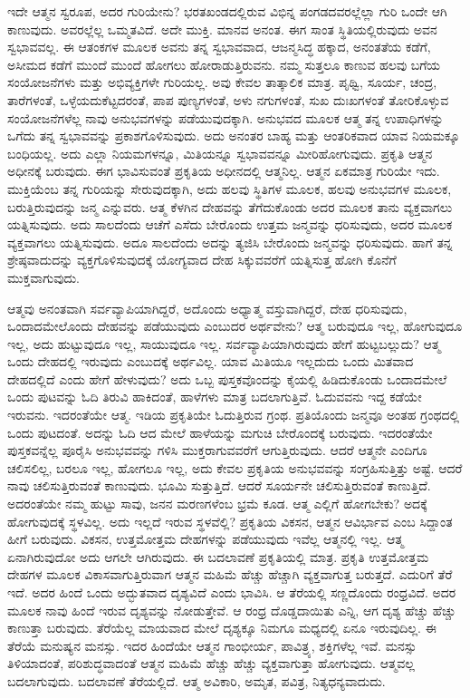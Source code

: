 ಇದೇ ಆತ್ಮನ ಸ್ವರೂಪ, ಅದರ ಗುರಿಯೇನು? ಭರತಖಂಡದಲ್ಲಿರುವ ವಿಭಿನ್ನ ಪಂಗಡದವರಲ್ಲೆಲ್ಲಾ ಗುರಿ ಒಂದೇ ಆಗಿ ಕಾಣುವುದು. ಅವರಲ್ಲೆಲ್ಲ ಒಮ್ಮತವಿದೆ. ಅದೇ ಮುಕ್ತಿ. ಮಾನವ ಅನಂತ. ಈಗ ಸಾಂತ ಸ್ಥಿತಿಯಲ್ಲಿರುವುದು ಅವನ ಸ್ವಭಾವವಲ್ಲ. ಈ ಆತಂಕಗಳ ಮೂಲಕ ಅವನು ತನ್ನ ಸ್ವಭಾವವಾದ, ಆಜನ್ಮಸಿದ್ಧ ಹಕ್ಕಾದ, ಅನಂತತೆಯ ಕಡೆಗೆ, ಅಸೀಮದ ಕಡೆಗೆ ಮುಂದೆ ಮುಂದೆ ಹೋಗಲು ಹೋರಾಡುತ್ತಿರುವನು. ನಮ್ಮ ಸುತ್ತಲೂ ಕಾಣುವ ಹಲವು ಬಗೆಯ ಸಂಯೋಜನೆಗಳು ಮತ್ತು ಅಭಿವ್ಯಕ್ತಿಗಳೇ ಗುರಿಯಲ್ಲ. ಅವು ಕೇವಲ ತಾತ್ಕಾಲಿಕ ಮಾತ್ರ. ಪೃಥ್ವಿ, ಸೂರ್ಯ, ಚಂದ್ರ, ತಾರೆಗಳಂತೆ, ಒಳ್ಳೆಯದು\break ಕೆಟ್ಟದರಂತೆ, ಪಾಪ ಪುಣ್ಯಗಳಂತೆ, ಅಳು ನಗುಗಳಂತೆ, ಸುಖ ದುಃಖಗಳಂತೆ ತೋರಿಕೊಳ್ಳುವ ಸಂಯೋಜನೆಗಳೆಲ್ಲ ನಾವು ಅನುಭವಗಳನ್ನು ಪಡೆಯುವುದಕ್ಕಾಗಿ. ಅನುಭವದ ಮೂಲಕ ಆತ್ಮ ತನ್ನ ಉಪಾಧಿಗಳನ್ನು ಒಗೆದು ತನ್ನ ಸ್ವಭಾವವನ್ನು ಪ್ರಕಾಶಗೊಳಿಸುವುದು. ಅದು ಅನಂತರ ಬಾಹ್ಯ ಮತ್ತು ಆಂತರಿಕವಾದ ಯಾವ ನಿಯಮಕ್ಕೂ ಬಂಧಿಯಲ್ಲ. ಅದು ಎಲ್ಲಾ ನಿಯಮಗಳನ್ನೂ, ಮಿತಿಯನ್ನೂ ಸ್ವಭಾವವನ್ನೂ ಮೀರಿಹೋಗುವುದು. ಪ್ರಕೃತಿ ಆತ್ಮನ ಅಧೀನಕ್ಕೆ ಬರುವುದು. ಈಗ ಭಾವಿಸುವಂತೆ ಪ್ರಕೃತಿಯ ಅಧೀನದಲ್ಲಿ ಆತ್ಮನಿಲ್ಲ. ಆತ್ಮನ ಏಕಮಾತ್ರ ಗುರಿಯೇ ಇದು. ಮುಕ್ತಿಯೆಂಬ ತನ್ನ ಗುರಿಯನ್ನು ಸೇರುವುದಕ್ಕಾಗಿ, ಅದು ಹಲವು ಸ್ಥಿತಿಗಳ ಮೂಲಕ, ಹಲವು ಅನುಭವಗಳ ಮೂಲಕ, ಬರುತ್ತಿರುವುದನ್ನು ಜನ್ಮ ಎನ್ನುವರು. ಆತ್ಮ ಕೆಳಗಿನ ದೇಹವನ್ನು ತೆಗೆದುಕೊಂಡು ಅದರ ಮೂಲಕ ತಾನು ವ್ಯಕ್ತವಾಗಲು ಯತ್ನಿಸುವುದು. ಅದು ಸಾಲದೆಂದು ಆಚೆಗೆ ಎಸೆದು ಬೇರೊಂದು ಉತ್ತಮ ಜನ್ಮವನ್ನು ಧರಿಸುವುದು, ಅದರ ಮೂಲಕ ವ್ಯಕ್ತವಾಗಲು ಯತ್ನಿಸುವುದು. ಅದೂ ಸಾಲದೆಂದು ಅದನ್ನು ತ್ಯಜಿಸಿ ಬೇರೊಂದು ಜನ್ಮವನ್ನು ಧರಿಸುವುದು. ಹಾಗೆ ತನ್ನ ಶ್ರೇಷ್ಠವಾದುದನ್ನು ವ್ಯಕ್ತಗೊಳಿಸುವುದಕ್ಕೆ ಯೋಗ್ಯವಾದ ದೇಹ ಸಿಕ್ಕುವವರೆಗೆ ಯತ್ನಿಸುತ್ತ ಹೋಗಿ ಕೊನೆಗೆ ಮುಕ್ತವಾಗುವುದು.

ಆತ್ಮವು ಅನಂತವಾಗಿ ಸರ್ವವ್ಯಾಪಿಯಾಗಿದ್ದರೆ, ಅದೊಂದು ಅಧ್ಯಾತ್ಮ ವಸ್ತುವಾಗಿದ್ದರೆ, ದೇಹ ಧರಿಸುವುದು, ಒಂದಾದಮೇಲೊಂದು ದೇಹವನ್ನು ಪಡೆಯುವುದು ಎಂಬುದರ ಅರ್ಥವೇನು? ಆತ್ಮ ಬರುವುದೂ ಇಲ್ಲ, ಹೋಗುವುದೂ ಇಲ್ಲ, ಅದು ಹುಟ್ಟುವುದೂ ಇಲ್ಲ, ಸಾಯುವುದೂ ಇಲ್ಲ. ಸರ್ವವ್ಯಾಪಿಯಾಗಿರುವುದು ಹೇಗೆ ಹುಟ್ಟಬಲ್ಲುದು? ಆತ್ಮ ಒಂದು ದೇಹದಲ್ಲಿ ಇರುವುದು ಎಂಬುದಕ್ಕೆ ಅರ್ಥವಿಲ್ಲ. ಯಾವ ಮಿತಿಯೂ ಇಲ್ಲದುದು ಒಂದು ಮಿತವಾದ ದೇಹದಲ್ಲಿದೆ ಎಂದು ಹೇಗೆ ಹೇಳುವುದು? ಅದು ಒಬ್ಬ ಪುಸ್ತಕವೊಂದನ್ನು ಕೈಯಲ್ಲಿ ಹಿಡಿದುಕೊಂಡು ಒಂದಾದಮೇಲೆ ಒಂದು ಪುಟವನ್ನು ಓದಿ ತಿರುವಿ ಹಾಕಿದಂತೆ, ಹಾಳೆಗಳು ಮಾತ್ರ ಬದಲಾಗುತ್ತಿವೆ. ಓದುವವನು ಇದ್ದ ಕಡೆಯೇ ಇರುವನು. ಇದರಂತೆಯೇ ಆತ್ಮ. ಇಡಿಯ ಪ್ರಕೃತಿಯೇ ಓದುತ್ತಿರುವ ಗ್ರಂಥ. ಪ್ರತಿಯೊಂದು ಜನ್ಮವೂ ಅಂತಹ ಗ್ರಂಥದಲ್ಲಿ ಒಂದು ಪುಟದಂತೆ. ಅದನ್ನು ಓದಿ ಆದ ಮೇಲೆ ಹಾಳೆಯನ್ನು ಮಗುಚಿ ಬೇರೊಂದಕ್ಕೆ ಬರುವುದು. ಇದರಂತೆಯೇ ಪುಸ್ತಕವನ್ನೆಲ್ಲ ಪೂರೈಸಿ ಅನುಭವವನ್ನು ಗಳಿಸಿ ಮುಕ್ತರಾಗುವವರೆಗೆ ಆಗುತ್ತಿರುವುದು. ಆದರೆ ಆತ್ಮನೇ ಎಂದಿಗೂ ಚಲಿಸಲಿಲ್ಲ, ಬರಲೂ ಇಲ್ಲ, ಹೋಗಲೂ ಇಲ್ಲ, ಅದು ಕೇವಲ ಪ್ರಕೃತಿಯ ಅನುಭವವನ್ನು ಸಂಗ್ರಹಿಸುತ್ತಿತ್ತು ಅಷ್ಟೆ. ಆದರೆ ನಾವು ಚಲಿಸುತ್ತಿರುವಂತೆ ಕಾಣುವುದು. ಭೂಮಿ ಸುತ್ತುತ್ತಿದೆ. ಆದರೆ ಸೂರ್ಯನೇ ಚಲಿಸುತ್ತಿರುವಂತೆ ಕಾಣುತ್ತಿದೆ. ಅದರಂತೆಯೇ ನಮ್ಮ ಹುಟ್ಟು ಸಾವು, ಜನನ ಮರಣಗಳೆಂಬ ಭ್ರಮೆ ಕೂಡ. ಆತ್ಮ ಎಲ್ಲಿಗೆ ಹೋಗಬೇಕು? ಅದಕ್ಕೆ ಹೋಗುವುದಕ್ಕೆ ಸ್ಥಳವಿಲ್ಲ. ಅದು ಇಲ್ಲದೆ ಇರುವ ಸ್ಥಳವೆಲ್ಲಿ?
\newpage
ಪ್ರಕೃತಿಯ ವಿಕಸನ, ಆತ್ಮನ ಆವಿರ್ಭಾವ ಎಂಬ ಸಿದ್ದಾಂತ ಹೀಗೆ ಬರುವುದು. ವಿಕಸನ, ಉತ್ತಮೋತ್ತಮ ದೇಹಗಳನ್ನು ಪಡೆಯುವುದು ಇವೆಲ್ಲ ಆತ್ಮನಲ್ಲಿ ಇಲ್ಲ. ಆತ್ಮ ಏನಾಗಿರುವುದೋ ಅದು ಆಗಲೇ ಆಗಿರುವುದು. ಈ ಬದಲಾವಣೆ ಪ್ರಕೃತಿಯಲ್ಲಿ ಮಾತ್ರ. ಪ್ರಕೃತಿ ಉತ್ತಮೋತ್ತಮ ದೇಹಗಳ ಮೂಲಕ ವಿಕಾಸವಾಗುತ್ತಿರುವಾಗ ಆತ್ಮನ ಮಹಿಮೆ ಹೆಚ್ಚು ಹೆಚ್ಚಾಗಿ ವ್ಯಕ್ತವಾಗುತ್ತ ಬರುತ್ತದೆ. ಎದುರಿಗೆ ತೆರೆ ಇದೆ. ಅದರ ಹಿಂದೆ ಒಂದು ಅದ್ಭುತವಾದ ದೃಶ್ಯವಿದೆ ಎಂದು ಭಾವಿಸಿ. ಆ ತೆರೆಯಲ್ಲಿ ಸಣ್ಣದೊಂದು ರಂಧ್ರವಿದೆ. ಅದರ ಮೂಲಕ ನಾವು ಹಿಂದೆ ಇರುವ ದೃಶ್ಯವನ್ನು ನೋಡುತ್ತೇವೆ. ಆ ರಂಧ್ರ ದೊಡ್ಡದಾಯಿತು ಎನ್ನಿ, ಆಗ ದೃಶ್ಯ ಹೆಚ್ಚು ಹೆಚ್ಚು ಕಾಣುತ್ತಾ ಬರುವುದು. ತೆರೆಯೆಲ್ಲ ಮಾಯವಾದ ಮೇಲೆ ದೃಶ್ಯಕ್ಕೂ ನಿಮಗೂ ಮಧ್ಯದಲ್ಲಿ ಏನೂ ಇರುವುದಿಲ್ಲ. ಈ ತೆರೆಯೆ ಮನುಷ್ಯನ ಮನಸ್ಸು. ಇದರ ಹಿಂದೆಯೇ ಆತ್ಮನ ಗಾಂಭೀರ್ಯ, ಪಾವಿತ್ರ್ಯ, ಶಕ್ತಿಗಳೆಲ್ಲ ಇವೆ. ಮನಸ್ಸು ತಿಳಿಯಾದಂತೆ, ಪರಿಶುದ್ಧವಾದಂತೆ ಆತ್ಮನ ಮಹಿಮೆ ಹೆಚ್ಚು ಹೆಚ್ಚು ವ್ಯಕ್ತವಾಗುತ್ತಾ ಹೋಗುವುದು. ಆತ್ಮವಲ್ಲ ಬದಲಾಗುವುದು. ಬದಲಾವಣೆ ತೆರೆಯಲ್ಲಿದೆ. ಆತ್ಮ ಅವಿಕಾರಿ, ಅಮೃತ, ಪವಿತ್ರ, ನಿತ್ಯ\break ಧನ್ಯವಾದುದು.

